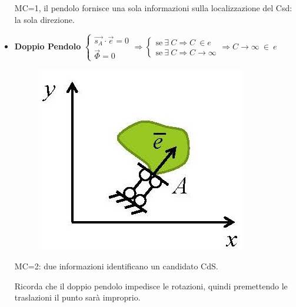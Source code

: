 \documentclass{article}
\begin{document}
\begin{adjustwidth}{2in}{}
\begin{itemize}
MC=1, il pendolo fornisce una sola informazioni sulla localizzazione del Csd: la sola direzione. 
\item \textbf{Doppio Pendolo} $\begin{cases}
	\vec{s_A} \cdot \vec{e} = 0 \\
	\vec{\Phi} = 0
\end{cases} \Rightarrow \begin{cases}
\text{se} ~ \exists ~ C \Rightarrow C ~ \in e\\
\text{se} ~ \exists ~ C \Rightarrow C \rightarrow \infty
\end{cases} \Rightarrow C \rightarrow \infty ~ \in ~ e$
\begin{figure}[H]
	\centering
	\includegraphics[width=0.15\linewidth]{immagini/1.PARTE3_Pagina_11 (2)}
\end{figure}
MC=2: due informazioni identificano un candidato CdS.

Ricorda che il doppio pendolo impedisce le rotazioni, quindi premettendo le traslazioni il punto sarà improprio. 


\end{itemize}
\end{adjustwidth}
\end{document}
